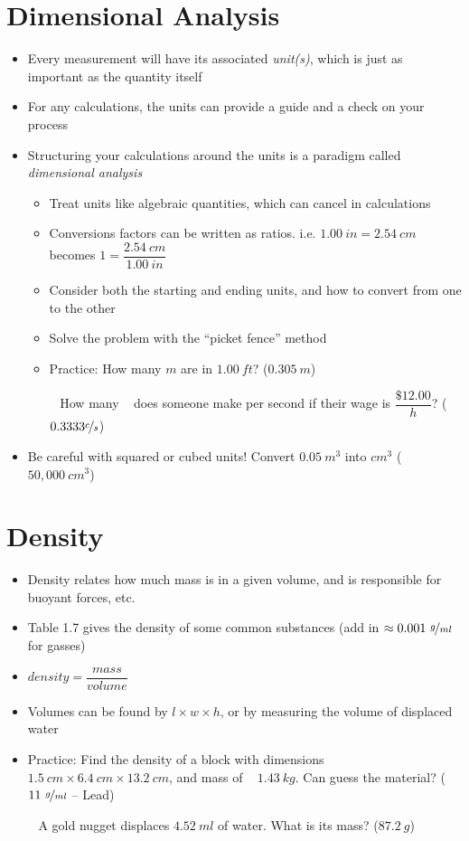 \documentclass[12pt, openany, letterpaper]{memoir}
\begin{document}
\section{Dimensional Analysis}
\begin{itemize}
	\item Every measurement will have its associated \emph{unit(s)}, which is just as important as the quantity itself
	\item For any calculations, the units can provide a guide and a check on your process
	\item Structuring your calculations around the units is a paradigm called \emph{dimensional analysis}
	      \begin{itemize}
		      \item Treat units like algebraic quantities, which can cancel in calculations
		      \item Conversions factors can be written as ratios. i.e. $1.00~in = 2.54~cm$ becomes $1=\dfrac{2.54~cm}{1.00~in}$
		      \item Consider both the starting and ending units, and how to convert from one to the other
		      \item Solve the problem with the ``picket fence'' method
		      \item Practice: How many $m$ are in $1.00~ft$? ($0.305~m$)

		            ~\hphantom{Practice:} How many \textcent~ does someone make per second if their wage is $\dfrac{\$12.00}{h}$? ($0.3333\nicefrac{c}{s}$)
	      \end{itemize}
	\item Be careful with squared or cubed units! Convert $0.05~m^3$ into $cm^3$ ($50,000~cm^3$)
\end{itemize}
\section{Density}
\begin{itemize}
	\item Density relates how much mass is in a given volume, and is responsible for buoyant forces, etc.
	\item Table 1.7 gives the density of some common substances (add in $\approx 0.001~\nicefrac{g}{ml}$ for gasses)
	\item $density=\dfrac{mass}{volume}$
	\item Volumes can be found by $l\times w\times h$, or by measuring the volume of displaced water
	\item Practice: Find the density of a block with dimensions $1.5~cm\times6.4~cm\times13.2~cm$, and mass of 	~\hphantom{Practice:} $1.43~kg$. Can guess the material? ($11~\nicefrac{g}{ml}$ -- Lead)

	      ~\hphantom{Practice:} A gold nugget displaces $4.52~ml$ of water. What is its mass? ($87.2~g$)
\end{itemize}
\end{document}
